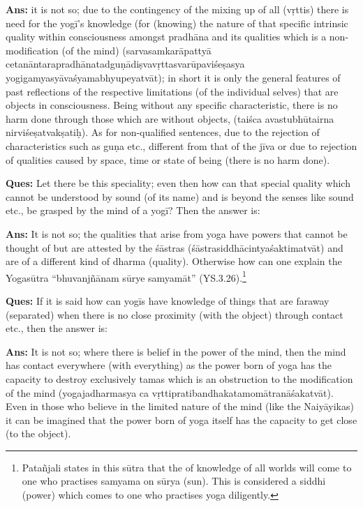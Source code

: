 \textbf{Ans:} it is not so; due to the contingency of the mixing up of all (vṛttis) there is need for the yogī’s knowledge (for (knowing) the nature of that specific intrinsic quality within consciousness amongst pradhāna and its qualities which is a non-modification (of the mind) (sarvasamkarāpattyā cetanāntarapradhānatadguṇādiṣvavṛttasvarūpaviśeṣasya yogi\-gamyasyāvaśyamabhyupeyatvāt); in short it is only the general features of past reflections of the respective limitations (of the individual selves) that are objects in consciousness. Being without any specific characteristic, there is no harm done through those which are without objects, (taiśca avastubhūtairna nirviśeṣatvakṣatiḥ). As for non-qualified sentences, due to the rejection of characteristics such as guṇa etc., different from that of the jīva or due to rejection of qualities caused by space, time or state of being (there is no harm done).

\vskip -1pt

\textbf{Ques:}  Let there be this speciality; even then how can that special quality which cannot be understood by sound (of its name) and is beyond the senses like sound etc., be grasped by the mind of a yogī? Then the answer is: 

\vskip -1pt

\textbf{Ans:} It is not so; the qualities that arise from yoga have powers that cannot be thought of but are attested by the śāstras (śāstrasiddhācintyaśaktimatvāt) and are of a different kind of dharma (quality). Otherwise how can one explain the Yogasūtra “bhuvanjñānam sūrye samyamāt” (YS.3.26).\footnote{Patañjali states in this sūtra that the of knowledge of all worlds will come to one who practises samyama on sūrya (sun). This is considered a siddhi (power) which comes to one who practises yoga diligently.} 

\vskip -1pt

\textbf{Ques:} If it is said how can yogīs have knowledge of things that are faraway (separated) when there is no close proximity (with the object) through contact etc., then the answer is: 

\vskip -1pt

\textbf{Ans:} It is not so; where there is belief in the power of the mind, then the mind has contact everywhere (with everything) as the power born of yoga has the capacity to destroy exclusively tamas which is an obstruction to the modification of the mind (yogajadharmasya ca vṛttipratibandhakatamomātranāśakatvāt). Even in those who believe in the limited nature of the mind (like the Naiyāyikas) it can be imagined that the power born of yoga itself has the capacity to get close (to the object).

